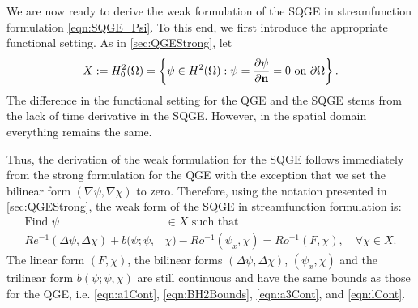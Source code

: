 We are now ready to derive the weak formulation of the SQGE in streamfunction
formulation \eqref{eqn:SQGE_Psi}. To this end, we first introduce the
appropriate functional setting. As in \autoref{sec:QGEStrong}, let
\begin{equation*}
  X := H^2_0(\Omega) = \left\{ \psi\in H^2(\Omega): \psi=\frac{\partial\psi}{\partial {\bf n}}=0
    \text{ on } \partial\Omega \right\} .
\end{equation*}
The difference in the functional setting for the QGE and the SQGE stems from the
lack of time derivative in the SQGE. However, in the spatial domain everything
remains the same.

Thus, the derivation of the weak formulation for the SQGE follows immediately
from the strong formulation for the QGE with the exception that we set the
bilinear form $(\nabla \psi, \nabla \chi)$ to zero. Therefore, using the
notation presented in \autoref{sec:QGEStrong}, the weak form of the SQGE in streamfunction
formulation is:
\begin{equation}
  \begin{split}
    \text{Find }\psi &\in X \text{ such that} \\
    Re^{-1} (\Delta \psi, \Delta \chi) + b(\psi;\psi,&\chi) - Ro^{-1} (\psi_x,\chi) =
      Ro^{-1} (F,\chi),\quad \forall \chi \in X.  \end{split} \label{eqn:SQGEWF}
\end{equation}
The linear form $(F, \chi)$, the bilinear forms $(\Delta \psi, \Delta \chi)$,
$(\psi_x, \chi)$ and the trilinear form $b(\psi;\psi,\chi)$ are still continuous
\cite{Cayco86} and have the same bounds as those for the QGE, i.e.
\eqref{eqn:a1Cont}, \eqref{eqn:BH2Bounds}, \eqref{eqn:a3Cont}, and
\eqref{eqn:lCont}.

